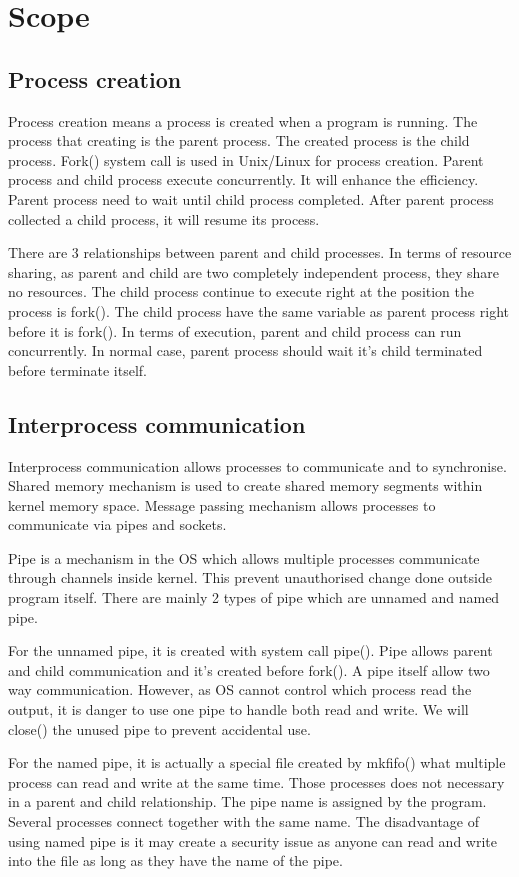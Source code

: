 \documentclass[12pt,a4paper]{report}
\begin{document}
\section{Scope}
\subsection{Process creation}
Process creation means a process is created when a program is running. The process that creating is the parent process. The created process is the child process. Fork() system call is used in Unix/Linux for process creation. Parent process and child process execute concurrently. It will enhance the efficiency. Parent process need to wait until child process completed. After parent process collected a child process, it will resume its process.

There are 3 relationships between parent and child processes. In terms of resource sharing, as parent and child are two completely independent process, they share no resources. The child process continue to execute right at the position the process is fork(). The child process have the same variable as parent process right before it is fork(). In terms of execution, parent and child process can run concurrently. In normal case, parent process should wait it’s child terminated before terminate itself.
\subsection{Interprocess communication}
Interprocess communication allows processes to communicate and to synchronise. Shared memory mechanism is used to create shared memory segments within kernel memory space. Message passing mechanism allows processes to communicate via pipes and sockets. 

Pipe is a mechanism in the OS which allows multiple processes communicate through channels inside kernel. This prevent unauthorised change done outside program itself. There are mainly 2 types of pipe which are unnamed and named pipe.

For the unnamed pipe, it is created with system call pipe(). Pipe allows parent and child communication and it’s created before fork(). A pipe itself allow two way communication. However, as OS cannot control which process read the output, it is danger to use one pipe to handle both read and write. We will close() the unused pipe to prevent accidental use.

For the named pipe, it is actually a special file created by mkfifo() what multiple process can read and write at the same time. Those processes does not necessary in a parent and child relationship. The pipe name is assigned by the program. Several processes connect together with the same name. The disadvantage of using named pipe is it may create a security issue as anyone can read and write into the file as long as they have the name of the pipe.
\end{document}
